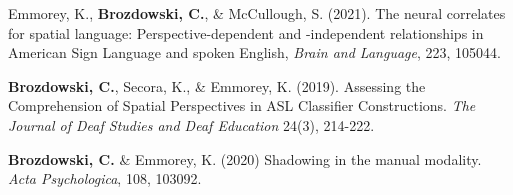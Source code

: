 

\par
\begin{cvparagraphlist}
  Emmorey, K., \textbf{Brozdowski, C.}, \& McCullough, S. (2021). The neural correlates for spatial language: Perspective-dependent and -independent relationships in American Sign Language and spoken English, \textit{Brain and Language}, 223, 105044. \par 
  \textbf{Brozdowski, C.}, Secora, K., \& Emmorey, K. (2019). Assessing the Comprehension of Spatial Perspectives in ASL Classifier Constructions. \textit{The Journal of Deaf Studies and Deaf Education} 24(3), 214-222. \par 
  \textbf{Brozdowski, C.} \& Emmorey, K. (2020) Shadowing in the manual modality. \textit{Acta Psychologica}, 108, 103092. \par 
\end{cvparagraphlist}

